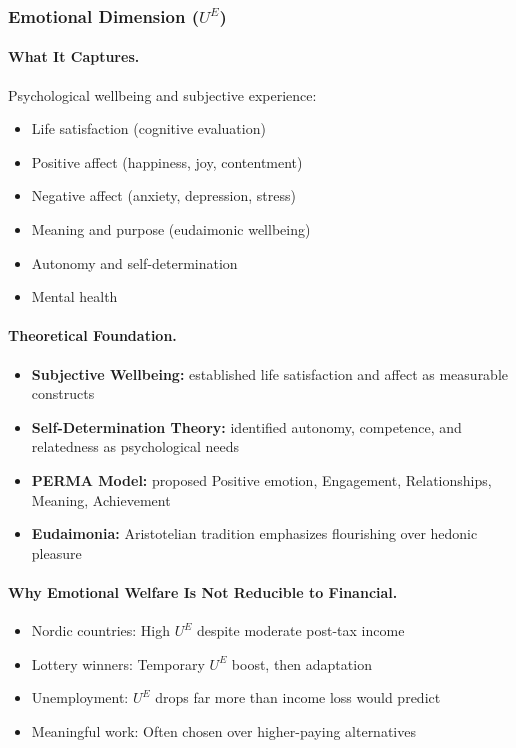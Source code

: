 \subsubsection{Emotional Dimension ($U^E$)}

\paragraph{What It Captures.}
Psychological wellbeing and subjective experience:
\begin{itemize}
\item Life satisfaction (cognitive evaluation)
\item Positive affect (happiness, joy, contentment)
\item Negative affect (anxiety, depression, stress)
\item Meaning and purpose (eudaimonic wellbeing)
\item Autonomy and self-determination
\item Mental health
\end{itemize}

\paragraph{Theoretical Foundation.}
\begin{itemize}
\item \textbf{Subjective Wellbeing:} \citet{diener1999subjective} established 
life satisfaction and affect as measurable constructs
\item \textbf{Self-Determination Theory:} \citet{ryan2000self} identified 
autonomy, competence, and relatedness as psychological needs
\item \textbf{PERMA Model:} \citet{seligman2011flourish} proposed Positive emotion, 
Engagement, Relationships, Meaning, Achievement
\item \textbf{Eudaimonia:} Aristotelian tradition emphasizes flourishing 
over hedonic pleasure
\end{itemize}

\paragraph{Why Emotional Welfare Is Not Reducible to Financial.}
\begin{itemize}
\item Nordic countries: High $U^E$ despite moderate post-tax income
\item Lottery winners: Temporary $U^E$ boost, then adaptation
\item Unemployment: $U^E$ drops far more than income loss would predict
\item Meaningful work: Often chosen over higher-paying alternatives
\end{itemize}

